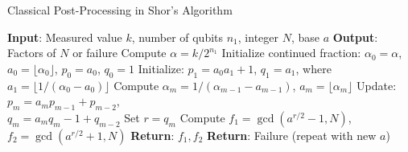 \documentclass[conference,twoside]{IEEEtran}
\begin{document}
\begin{algorithm}
\caption{Classical Post-Processing in Shor's Algorithm}
\label{alg:classical_pos}
\begin{algorithmic}
\State \textbf{Input}: Measured value \( k \), number of qubits \( n_1 \), integer \( N \), base \( a \)
\State \textbf{Output}: Factors of \( N \) or failure
\State Compute \( \alpha = k / 2^{n_1} \)
\State Initialize continued fraction: \( \alpha_0 = \alpha \), \( a_0 = \lfloor \alpha_0 \rfloor \), \( p_0 = a_0 \), \( q_0 = 1 \)
\State Initialize: \( p_1 = a_0 a_1 + 1 \), \( q_1 = a_1 \), where \( a_1 = \lfloor 1 / (\alpha_0 - a_0) \rfloor \)
    \State Compute \( \alpha_m = 1 / (\alpha_{m-1} - a_{m-1}) \), \( a_m = \lfloor \alpha_m \rfloor \)
    \State Update: \( p_m = a_m p_{m-1} + p_{m-2} \), \\ \hspace*{4.5em} \( q_m = a_m q_m-1 + q_{m-2} \)
        \State Set \( r = q_m \)
            \State Compute \( f_1 = \gcd(a^{r/2} - 1, N) \), \\
            \hspace*{8em} \( f_2 = \gcd(a^{r/2} + 1, N) \)
                \State \textbf{Return}: \( f_1, f_2 \)
            \EndIf
        \EndIf
    \EndIf
\EndFor
\State \textbf{Return}: Failure (repeat with new \( a \))
\end{algorithmic}
\end{algorithm}
\end{document}
